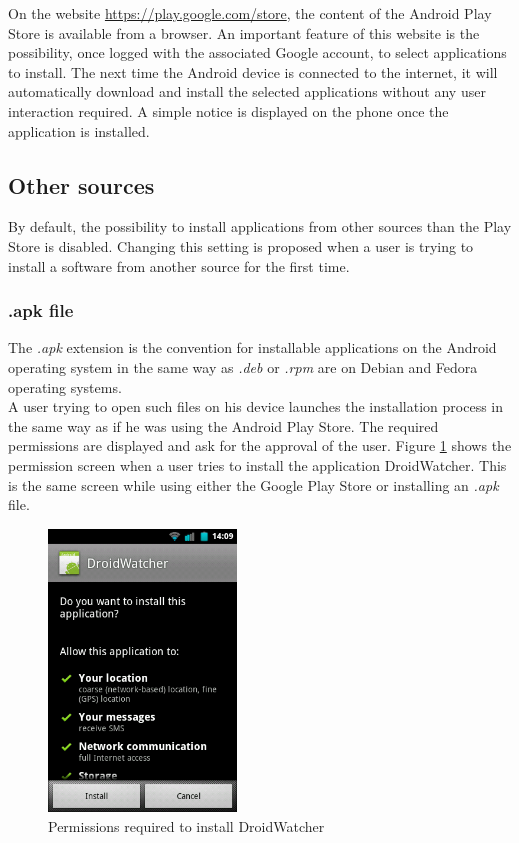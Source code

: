 On the website \url{https://play.google.com/store}, the content of the Android Play Store is available from a browser.
An important feature of this website is the possibility, once logged with the associated Google account, to select applications to install.
The next time the Android device is connected to the internet, it will automatically download and install the selected applications without any user interaction required.
A simple notice is displayed on the phone once the application is installed.\\


\subsection{Other sources}
By default, the possibility to install applications from other sources than the Play Store is disabled.
Changing this setting is proposed when a user is trying to install a software from another source for the first time.

\subsubsection{.apk file}
The \emph{.apk} extension is the convention for installable applications on the Android operating system in the same way as \emph{.deb} or \emph{.rpm} are on Debian and Fedora operating systems.\\

A user trying to open such files on his device launches the installation process in the same way as if he was using the Android Play Store.
The required permissions are displayed and ask for the approval of the user.
Figure \ref{fig:perm-dw} shows the permission screen when a user tries to install the application DroidWatcher.
This is the same screen while using either the Google Play Store or installing an \emph{.apk} file.\\

\begin{figure}[h]
  \centering
  \includegraphics[width=5cm]{images/permissions.png}
  \caption{Permissions required to install DroidWatcher}
  \label{fig:perm-dw}
\end{figure}


